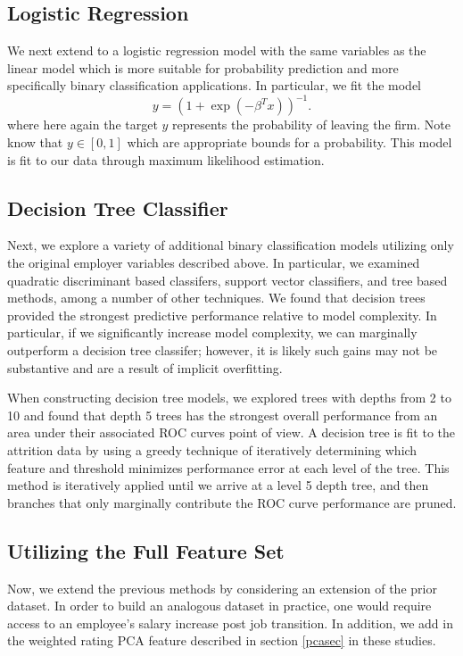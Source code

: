 \documentclass[10pt]{article}
\begin{document}
\subsection{Logistic Regression} We next extend to a logistic regression model with the 
same variables as the linear model which 
is more suitable for probability prediction and more specifically binary classification 
applications.   In particular, we fit the model 
%
\begin{equation}
    y = (1+\exp(-\beta^Tx))^{-1}.
\end{equation}
% 
where here again the target $y$ represents the probability of leaving the firm. 
Note know that $y\in[0,1]$ which are appropriate bounds for a probability.  This 
model is fit to our data through maximum likelihood estimation. 

\subsection{Decision Tree Classifier}  Next, we explore a variety of additional 
binary classification models utilizing only the original employer variables described above.
In particular, we examined quadratic discriminant based classifers, support vector classifiers, 
and tree based methods, among a number of other techniques.  We found that decision 
trees provided the strongest predictive performance relative to model complexity. 
In particular, if we significantly increase model complexity, we can marginally outperform 
a decision tree classifer; however, it is likely such gains may not be substantive and 
are a result of implicit overfitting. 


When constructing decision tree models, we explored trees with depths from 2 to 10 and 
found that depth 5 trees has the strongest overall performance from an area under their 
associated ROC curves point of view. 
A decision tree is fit to the attrition data by using a greedy technique of 
iteratively determining which feature and threshold minimizes performance error 
at each level of the tree.  This method is iteratively applied until we arrive 
at a level 5 depth tree, and then branches that only marginally contribute 
the ROC curve performance are pruned.  

\subsection{Utilizing the Full Feature Set} 
Now, we extend the previous methods by considering an extension of the 
prior dataset.  In order to build an analogous dataset in practice, one would require access to 
an employee's salary increase post job transition.
In addition, we add in the weighted rating PCA feature 
described in section \ref{pcasec} in these studies.
\end{document}
